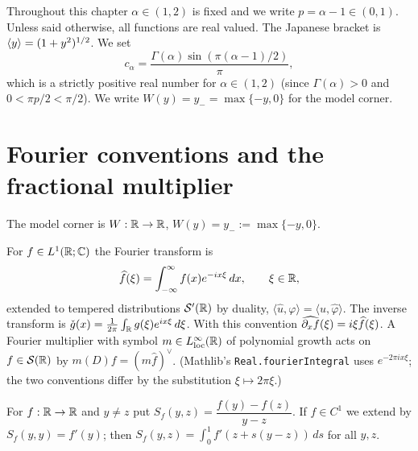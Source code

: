 
Throughout this chapter $\alpha\in(1,2)$ is fixed and we write $p=\alpha-1\in(0,1)$.
Unless said otherwise, all functions are real valued.  The Japanese bracket is
$\langle y \rangle=(1+y^2)^{1/2}$.  We set
\[
  c_\alpha=\frac{\Gamma(\alpha)\sin(\pi(\alpha-1)/2)}{\pi},
\]
which is a strictly positive real number for $\alpha\in(1,2)$ (since $\Gamma(\alpha)>0$ and
$0<\pi p/2<\pi/2$).  We write $W(y)=y_-=\max\{-y,0\}$ for the model corner.

\section{Fourier conventions and the fractional multiplier}

\begin{definition}
  \label{def:c01_corner}
  The model corner is $W:\mathbb{R}\to\mathbb{R}$, $W(y)=y_-:=\max\{-y,0\}$.
\end{definition}

\begin{definition}
  \label{def:fourier_convention}
  For $f\in L^1(\mathbb{R};\mathbb{C})$ the Fourier transform is
  \[
    \widehat f(\xi)=\int_{-\infty}^{\infty} f(x)e^{-ix\xi}\,dx ,\qquad \xi\in\mathbb{R},
  \]
  extended to tempered distributions $\mathcal S'(\mathbb{R})$ by duality,
  $\langle \widehat u,\varphi\rangle=\langle u,\widehat\varphi\rangle$.  The inverse transform is
  $\check{g}(x)=\frac1{2\pi}\int_{\mathbb{R}} g(\xi)e^{ix\xi}\,d\xi$.  With this convention
  $\widehat{\partial_x f}(\xi)=i\xi\widehat f(\xi)$.  A Fourier multiplier with symbol
  $m\in L^\infty_{\mathrm{loc}}(\mathbb{R})$ of polynomial growth acts on $f\in\mathcal S(\mathbb{R})$ by
  $m(D)f=(m\widehat f)^{\vee}$.  (Mathlib's \texttt{Real.fourierIntegral} uses
  $e^{-2\pi i x\xi}$; the two conventions differ by the substitution $\xi\mapsto 2\pi\xi$.)
\end{definition}

\begin{definition}[Secant]
  \label{def:c01_secant}
  For $f:\mathbb{R}\to\mathbb{R}$ and $y\neq z$ put $S_f(y,z)=\dfrac{f(y)-f(z)}{y-z}$.  If $f\in C^1$ we extend
  by $S_f(y,y)=f'(y)$; then $S_f(y,z)=\int_0^1 f'(z+s(y-z))\,ds$ for all $y,z$.
\end{definition}

